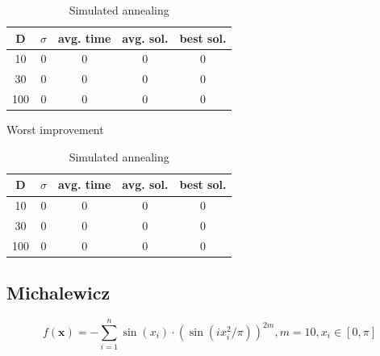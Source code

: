 \documentclass{article}
\begin{document}
\begin{table}[!htbp]
\begin{minipage}{.4\linewidth}
    \centering

    \begin{tabular}{|c|c|c|c|c|}
    \hline
    D   & $\sigma$  & avg. time     & avg. sol.     & best sol. \\
    \hline
    10  & 0         & 0             & 0             & 0 \\
    \hline
    30  & 0         & 0             & 0             & 0 \\
    \hline
    100 & 0         & 0             & 0             & 0 \\
    \hline
    \end{tabular}
    \caption{Worst improvement}
  \end{minipage}%
  \quad %
  \begin{minipage}{.75\linewidth}
    \centering

    \begin{tabular}{|c|c|c|c|c|}
    \hline
    D   & $\sigma$  & avg. time     & avg. sol.     & best sol. \\
    \hline
    10  & 0         & 0             & 0             & 0 \\
    \hline
    30  & 0         & 0             & 0             & 0 \\
    \hline
    100 & 0         & 0             & 0             & 0 \\
    \hline
    \end{tabular}
    \caption{Simulated annealing}
  \end{minipage}
\end{table}

\newpage
\setcounter{table}{0}


\subsection{Michalewicz}
$$f(\mathbf{x}) = -\sum_{i=1}^{n} \sin(x_i) \cdot \left(\sin\left(ix_i^2 / \pi\right)\right)^{2m} , m = 10, x_i \in \left[0,\pi\right]$$

\end{document}
